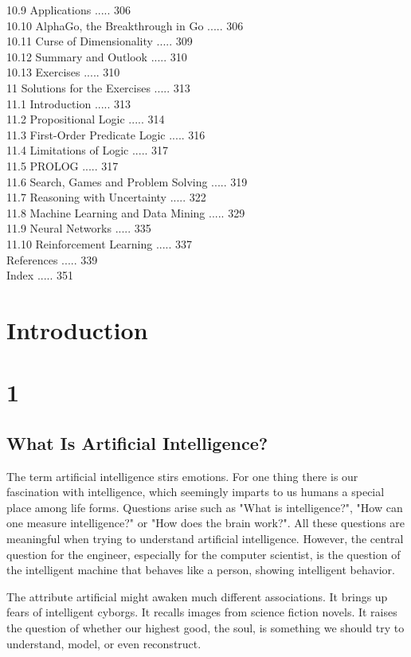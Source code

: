 \documentclass[10pt]{article}
\begin{document}
10.9 Applications ..... 306\\
10.10 AlphaGo, the Breakthrough in Go ..... 306\\
10.11 Curse of Dimensionality ..... 309\\
10.12 Summary and Outlook ..... 310\\
10.13 Exercises ..... 310\\
11 Solutions for the Exercises ..... 313\\
11.1 Introduction ..... 313\\
11.2 Propositional Logic ..... 314\\
11.3 First-Order Predicate Logic ..... 316\\
11.4 Limitations of Logic ..... 317\\
11.5 PROLOG ..... 317\\
11.6 Search, Games and Problem Solving ..... 319\\
11.7 Reasoning with Uncertainty ..... 322\\
11.8 Machine Learning and Data Mining ..... 329\\
11.9 Neural Networks ..... 335\\
11.10 Reinforcement Learning ..... 337\\
References ..... 339\\
Index ..... 351

\section*{Introduction}
\section*{1}
\subsection*{What Is Artificial Intelligence?}
The term artificial intelligence stirs emotions. For one thing there is our fascination with intelligence, which seemingly imparts to us humans a special place among life forms. Questions arise such as "What is intelligence?", "How can one measure intelligence?" or "How does the brain work?". All these questions are meaningful when trying to understand artificial intelligence. However, the central question for the engineer, especially for the computer scientist, is the question of the intelligent machine that behaves like a person, showing intelligent behavior.

The attribute artificial might awaken much different associations. It brings up fears of intelligent cyborgs. It recalls images from science fiction novels. It raises the question of whether our highest good, the soul, is something we should try to understand, model, or even reconstruct.
\end{document}
